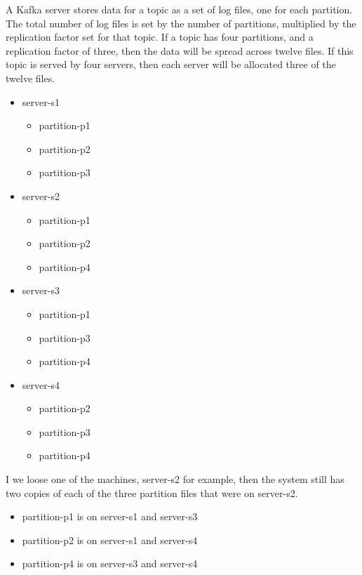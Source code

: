 \documentclass{article}
\begin{document}
A Kafka server stores data for a topic as a set of log files, one for each partition.
The total number of log files is set by the number of partitions, multiplied by the replication factor set for that topic.
If a topic has four partitions, and a replication factor of three, then the data will be spread across twelve files.
If this topic is served by four servers, then each server will be allocated three of the twelve files.

\begin{itemize}
    \item server-s1
    \begin{itemize}
        \item partition-p1
        \item partition-p2
        \item partition-p3
    \end{itemize}
    \item server-s2
    \begin{itemize}
        \item partition-p1
        \item partition-p2
        \item partition-p4
    \end{itemize}
    \item server-s3
    \begin{itemize}
        \item partition-p1
        \item partition-p3
        \item partition-p4
    \end{itemize}
    \item server-s4
    \begin{itemize}
        \item partition-p2
        \item partition-p3
        \item partition-p4
    \end{itemize}
\end{itemize}

I we loose one of the machines, server-s2 for example, then the system still has two copies of each of the three partition files that were on server-s2.

\begin{itemize}
    \item partition-p1 is on server-s1 and server-s3
    \item partition-p2 is on server-s1 and server-s4
    \item partition-p4 is on server-s3 and server-s4
\end{itemize}
\end{document}
